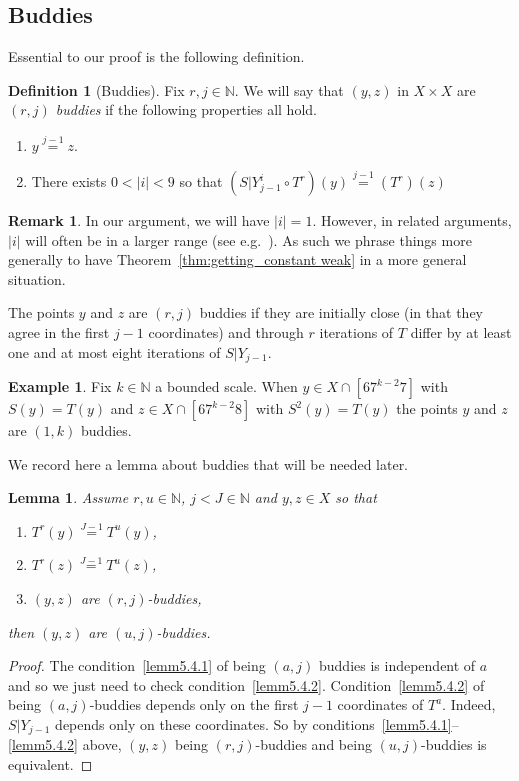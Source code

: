 \documentclass[10pt]{amsart}
\newtheorem{lemm}[theo]{Lemma}\newtheorem{prop}[theo]{Proposition}\newtheorem{coro}[theo]{Corollary}\newtheorem{conj}[theo]{Conjecture}
\theoremstyle{definition}\newtheorem{defi}[theo]{Definition}\newtheorem{rema}[theo]{Remark}\newtheorem{exam}[theo]{Example}\newtheorem{exem}[theo]{Example}\newtheorem{nota}[theo]{Notation}
\newcommand{\N}{\mathbb{N}}
\begin{document}
\subsection{Buddies}\label{subsec:buddies}

Essential to our proof is the following definition.

\begin{defi}[Buddies]\label{def:weak_friends}
Fix $r,j \in \N$. We will say that $(y,z)$ in $X \times X$ are
\emph{$(r,j)$ buddies} if the following properties all hold.
\begin{enumerate}
\item\label{cond:start same 2}
$y \overset{j-1}{=} z$.
\item\label{cond:differ by 1}
There exists $0 < |i| <9$ so that $(S|Y_{j-1}^i \circ T^r)(y) \overset{j-1}{=} (T^r)(z)$
\end{enumerate}
\end{defi}

\begin{rema}
In our argument, we will have $|i|=1$. However, in related arguments, $|i|$ will often be in a larger range (see e.g.~\cite{MR4251942}). As such we phrase things more generally to have Theorem~\ref{thm:getting_constant weak} in a more general situation.
\end{rema}


The points $y$ and $z$ are $(r,j)$ buddies if they are initially close (in that they agree in the first $j-1$ coordinates) and through $r$ iterations of $T$ differ by at least one and at most eight iterations of $S|Y_{j-1}$.

\begin{exam}
Fix $k \in \N$ a bounded scale. When $y \in X \cap [6 7^{k-2} 7]$ with $S(y) = T(y)$ and $z \in X \cap [6 7^{k-2}8]$ with $S^2(y) = T(y)$ the points $y$ and $z$ are $(1,k)$ buddies.
\end{exam}


We record here a lemma about buddies that will be needed later.

\begin{lemm}\label{lem:buddies through reduc}
Assume $r,u\in \N$, $j<J\in \N$ and $y,z\in X$ so that
\begin{enumerate}
\item\label{lemm5.4.1} $T^r(y) \overset{J-1}{=} T^u(y)$,
\item\label{lemm5.4.2} $T^r(z) \overset{J-1}{=} T^u(z)$,
\item\label{lemm5.4.3} $(y,z)$ are $(r,j)$-buddies,
\end{enumerate}
then $(y,z)$ are $(u,j)$-buddies.
\end{lemm}
\begin{proof}
The condition~\eqref{lemm5.4.1} of being $(a,j)$ buddies is independent of $a$ and so we just need to check condition~\eqref{lemm5.4.2}. Condition~\eqref{lemm5.4.2} of being $(a,j)$-buddies depends only on the first $j-1$ coordinates of $T^a$. Indeed, $S|Y_{j-1}$ depends only on these coordinates. So by conditions~\eqref{lemm5.4.1}--\eqref{lemm5.4.2} above, $(y,z)$ being $(r,j)$-buddies and being $(u,j)$-buddies is equivalent.
\end{proof}
\end{document}
